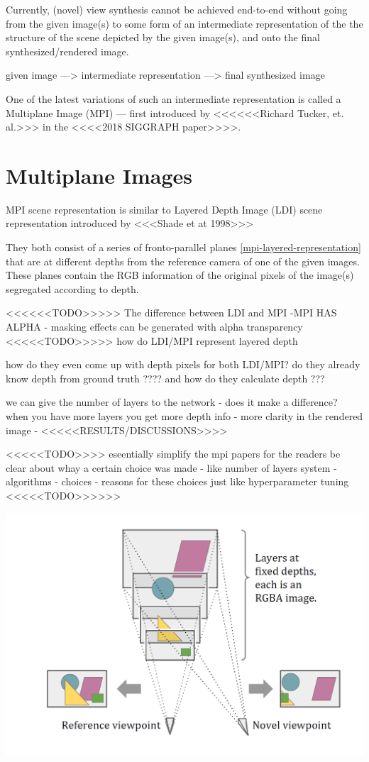 Currently, (novel) view synthesis cannot be achieved end-to-end without going from the given image(s) to some form of an intermediate representation of the the structure of the scene depicted by the given image(s), and onto the final synthesized/rendered image.

given image ---> intermediate representation ---> final synthesized image

One of the latest variations of such an intermediate representation is called a Multiplane Image (MPI) --- first introduced by <<<<<<Richard Tucker, et. al.>>> in the <<<<2018 SIGGRAPH paper>>>>.

\section{Multiplane Images}

MPI scene representation is similar to Layered Depth Image (LDI) scene representation introduced by <<<Shade et at 1998>>>

They both consist of a series of fronto-parallel planes \ref{mpi-layered-representation} that are at different depths from the reference camera of one of the given images. These planes contain the RGB information of the original pixels of the image(s) segregated according to depth.

<<<<<<TODO>>>>> The difference between LDI and MPI -MPI HAS ALPHA - masking effects can be generated with alpha transparency
<<<<<TODO>>>>> how do LDI/MPI represent layered depth

how do they even come up with depth pixels for both LDI/MPI? do they already know depth from ground truth ????
and how do they calculate depth ???

we can give the number of layers to the network - does it make a difference? 
when you have more layers you get more depth info - more clarity in the rendered image - <<<<<RESULTS/DISCUSSIONS>>>>

<<<<<TODO>>>>
eseentially simplify the mpi papers for the readers
be clear about whay a certain choice was made - like number of layers 
system - algorithms - choices - reasons for these choices 
just like hyperparameter tuning 
<<<<<TODO>>>>>>

\includegraphics{figures/mpi-layered-representation.png}\label{fig:mpi-layered-representation}

